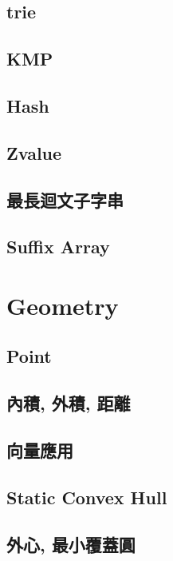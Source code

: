 \subsection{trie} 

\subsection{KMP} 

\subsection{Hash} 

\subsection{Zvalue} 

\subsection{最長迴文子字串} 

\subsection{Suffix Array} 


\section{Geometry}
\subsection{Point} 

\subsection{內積, 外積, 距離} 

\subsection{向量應用} 

\subsection{Static Convex Hull} 

\subsection{外心, 最小覆蓋圓} 


